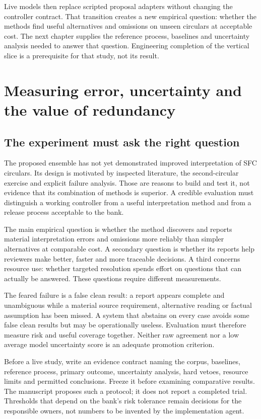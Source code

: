 \documentclass[12pt,a4paper,oneside,openany]{book}
\begin{document}
Live models then replace scripted proposal adapters without changing the controller
contract. That transition creates a new empirical question: whether the methods
find useful alternatives and omissions on unseen circulars at acceptable cost.
The next chapter supplies the reference process, baselines and uncertainty
analysis needed to answer that question. Engineering completion of the vertical
slice is a prerequisite for that study, not its result.

\chapter{Measuring error, uncertainty and the value of redundancy}
\label{ch:evaluation}

\section{The experiment must ask the right question}

The proposed ensemble has not yet demonstrated improved interpretation of SFC
circulars. Its design is motivated by inspected literature, the second-circular
exercise and explicit failure analysis. Those are reasons to build and test it,
not evidence that its combination of methods is superior. A credible evaluation
must distinguish a working controller from a useful interpretation method and
from a release process acceptable to the bank.

The main empirical question is whether the method discovers and reports material
interpretation errors and omissions more reliably than simpler alternatives at
comparable cost. A secondary question is whether its reports help reviewers make
better, faster and more traceable decisions. A third concerns resource use:
whether targeted resolution spends effort on questions that can actually be
answered. These questions require different measurements.

The feared failure is a false clean result: a report appears complete and
unambiguous while a material source requirement, alternative reading or factual
assumption has been missed. A system that abstains on every case avoids some false
clean results but may be operationally useless. Evaluation must therefore measure
risk and useful coverage together. Neither raw agreement nor a low average model
uncertainty score is an adequate promotion criterion.

Before a live study, write an evidence contract naming the corpus, baselines,
reference process, primary outcome, uncertainty analysis, hard vetoes, resource
limits and permitted conclusions. Freeze it before examining comparative results.
The manuscript proposes such a protocol; it does not report a completed trial.
Thresholds that depend on the bank's risk tolerance remain decisions for the
responsible owners, not numbers to be invented by the implementation agent.
\end{document}
